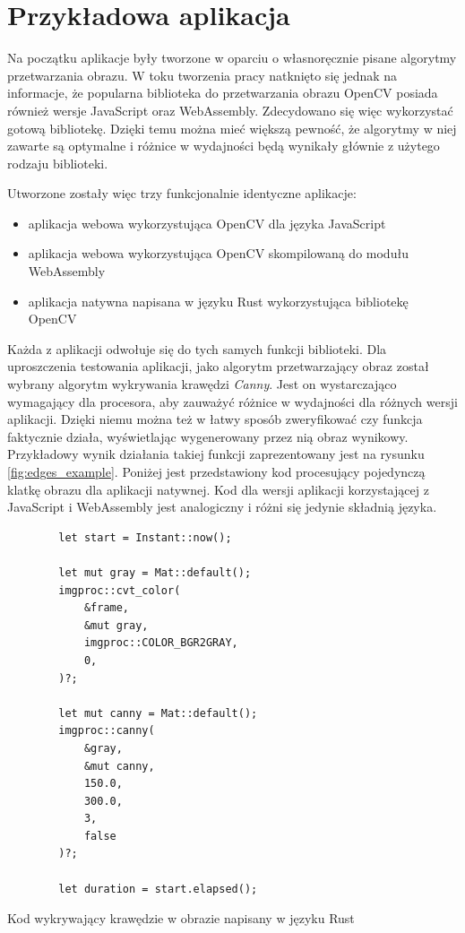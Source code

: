\documentclass[language=polish,type=master]{aghmodern}
\begin{document}
\section{Przykładowa aplikacja}
Na początku aplikacje były tworzone w oparciu o własnoręcznie pisane algorytmy przetwarzania obrazu.
W toku tworzenia pracy natknięto się jednak na informacje, że popularna biblioteka do przetwarzania obrazu OpenCV\footnotemark{} posiada również wersje JavaScript oraz WebAssembly.
Zdecydowano się więc wykorzystać gotową bibliotekę.
Dzięki temu można mieć większą pewność, że algorytmy w niej zawarte są optymalne i różnice w wydajności będą wynikały głównie z użytego rodzaju biblioteki.

Utworzone zostały więc trzy funkcjonalnie identyczne aplikacje:
\begin{itemize}
    \item aplikacja webowa wykorzystująca OpenCV dla języka JavaScript
    \item aplikacja webowa wykorzystująca OpenCV skompilowaną do modułu WebAssembly
    \item aplikacja natywna napisana w języku Rust wykorzystująca bibliotekę OpenCV
\end{itemize}

Każda z aplikacji odwołuje się do tych samych funkcji biblioteki.
Dla uproszczenia testowania aplikacji, jako algorytm przetwarzający obraz został wybrany algorytm wykrywania krawędzi \emph{Canny}\footnotemark{}.
Jest on wystarczająco wymagający dla procesora, aby zauważyć różnice w wydajności dla różnych wersji aplikacji.
Dzięki niemu można też w łatwy sposób zweryfikować czy funkcja faktycznie działa, wyświetlając wygenerowany przez nią obraz wynikowy.
Przykładowy wynik działania takiej funkcji zaprezentowany jest na rysunku \ref{fig:edges_example}.
Poniżej jest przedstawiony kod procesujący pojedynczą klatkę obrazu dla aplikacji natywnej.
Kod dla wersji aplikacji korzystającej z JavaScript i WebAssembly jest analogiczny i różni się jedynie składnią języka.

\begin{listing}[H]
    \begin{verbatim}
        let start = Instant::now();

        let mut gray = Mat::default();
        imgproc::cvt_color(
            &frame,
            &mut gray,
            imgproc::COLOR_BGR2GRAY,
            0,
        )?;

        let mut canny = Mat::default();
        imgproc::canny(
            &gray,
            &mut canny,
            150.0,
            300.0,
            3,
            false
        )?;

        let duration = start.elapsed();
    \end{verbatim}
    \caption{Kod wykrywający krawędzie w obrazie napisany w języku Rust}
\end{listing}
\end{document}
